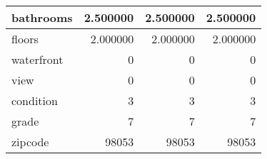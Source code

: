 \begin{table}[H]
\begin{tabular}{|l|r|r|r|}
\hline bathrooms & \cellcolor[rgb]{0.9, 0.54, 0.52} 2.500000 & \cellcolor[rgb]{0.9, 0.54, 0.52} 2.500000 & \cellcolor[rgb]{0.9, 0.54, 0.52} 2.500000 \\
\hline floors & \cellcolor[rgb]{0.9, 0.54, 0.52} 2.000000 & \cellcolor[rgb]{0.9, 0.54, 0.52} 2.000000 & \cellcolor[rgb]{0.9, 0.54, 0.52} 2.000000 \\
\hline waterfront & \cellcolor[rgb]{0.9, 0.54, 0.52} 0 & \cellcolor[rgb]{0.9, 0.54, 0.52} 0 & \cellcolor[rgb]{0.9, 0.54, 0.52} 0 \\
\hline view & \cellcolor[rgb]{0.9, 0.54, 0.52} 0 & \cellcolor[rgb]{0.9, 0.54, 0.52} 0 & \cellcolor[rgb]{0.9, 0.54, 0.52} 0 \\
\hline condition & \cellcolor[rgb]{0.9, 0.54, 0.52} 3 & \cellcolor[rgb]{0.9, 0.54, 0.52} 3 & \cellcolor[rgb]{0.9, 0.54, 0.52} 3 \\
\hline grade & \cellcolor[rgb]{0.9, 0.54, 0.52} 7 & \cellcolor[rgb]{0.9, 0.54, 0.52} 7 & \cellcolor[rgb]{0.9, 0.54, 0.52} 7 \\
\hline zipcode & \cellcolor[rgb]{0.9, 0.54, 0.52} 98053 & \cellcolor[rgb]{0.9, 0.54, 0.52} 98053 & \cellcolor[rgb]{0.9, 0.54, 0.52} 98053 \\
\hline
\end{tabular}
\end{table}
